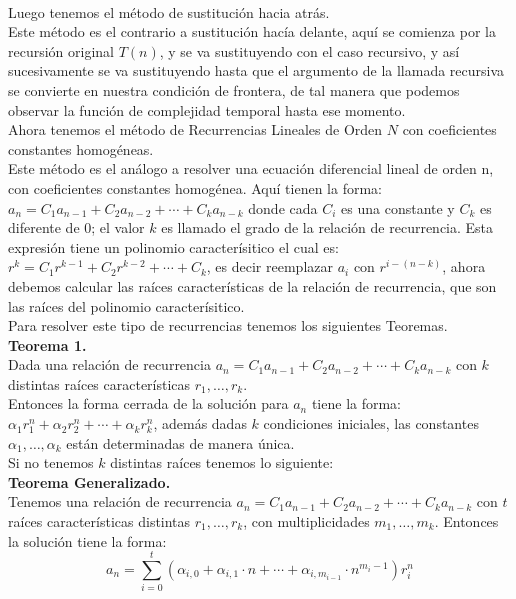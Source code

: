 \documentclass[12pt,twoside]{article}
\begin{document}
\\ Luego tenemos el método de sustitución hacia atrás.
\\ Este método es el contrario a sustitución hacía delante, aquí se comienza por la recursión original $T(n)$, y se va sustituyendo con el caso recursivo, y así sucesivamente se va sustituyendo hasta que el argumento de la llamada recursiva se convierte en nuestra condición de frontera, de tal manera que podemos observar la función de complejidad temporal hasta ese momento.
\newline
\\ Ahora tenemos el método de Recurrencias Lineales de Orden $N$ con coeficientes constantes homogéneas.
\\ Este método es el análogo a resolver una ecuación diferencial lineal de orden n, con coeficientes constantes homogénea. Aquí tienen la forma: 
\\ $a_n=C_1a_{n-1}+C_2a_{n-2}+\dotsm+C_ka_{n-k}$ donde cada $C_i$ es una constante y $C_k$ es diferente de 0; el valor $k$ es llamado el grado de la relación de recurrencia. Esta expresión tiene un polinomio caracterísitico el cual es: 
\\$r^k=C_1r^{k-1}+C_2r^{k-2}+\dotsm+C_k$, es decir reemplazar $a_i$ con $r^{i-(n-k)}$, ahora debemos calcular las raíces características de la relación de recurrencia, que son las raíces del polinomio caracterísitico.
\\ Para resolver este tipo de recurrencias tenemos los siguientes Teoremas.
\\ \textbf{Teorema 1.} 
\\ Dada una relación de recurrencia $a_n=C_1a_{n-1}+C_2a_{n-2}+\dotsm+C_ka_{n-k}$ con $k$ distintas raíces características $r_1,\dotsc,r_k$.
\\ Entonces la forma cerrada de la solución para $a_n$ tiene la forma: 
\\ $\alpha_1r_1^n+\alpha_2r_2^n+\dotsb+\alpha_kr_k^n$, además dadas $k$ condiciones iniciales, las constantes $\alpha_1,\dotsc,\alpha_k$ están determinadas de manera única.
\\ Si no tenemos $k$ distintas raíces tenemos lo siguiente:
\\ \textbf{Teorema Generalizado.}
\\ Tenemos una relación de recurrencia $a_n=C_1a_{n-1}+C_2a_{n-2}+\dotsm+C_ka_{n-k}$ con $t$ raíces características distintas $r_1,\dotsc,r_k$, con multiplicidades $m_1,\dotsc,m_k$. Entonces la solución tiene la forma:
\[ a_n = \sum_{i=0}^{t} (\alpha_{i,0}+\alpha_{i,1}\cdot n+\dotsb+\alpha_{i,m_{i-1}}\cdot n^{m_i-1})r_i^n  \]
\end{document}
